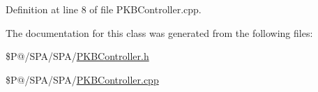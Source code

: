 Definition at line 8 of file P\-K\-B\-Controller.\-cpp.



The documentation for this class was generated from the following files\-:\begin{DoxyCompactItemize}
\item 
\$\-P@/\-S\-P\-A/\-S\-P\-A/\hyperlink{_p_k_b_controller_8h}{P\-K\-B\-Controller.\-h}\item 
\$\-P@/\-S\-P\-A/\-S\-P\-A/\hyperlink{_p_k_b_controller_8cpp}{P\-K\-B\-Controller.\-cpp}\end{DoxyCompactItemize}
